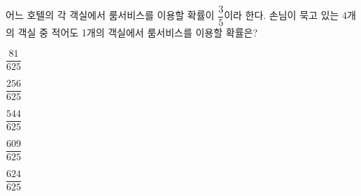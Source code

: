 어느 호텔의 각 객실에서 룸서비스를 이용할 확률이 $\dfrac{3}{5}$이라 한다. 손님이 묵고 있는 4개의 객실 중 적어도 1개의 객실에서 룸서비스를 이용할 확률은?
\begin{choices32}{\rule[-3ex]{0pt}{8ex}$\dfrac{81}{625}$}{\rule[-3ex]{0pt}{8ex}$\dfrac{256}{625}$}{\rule[-3ex]{0pt}{8ex}$\dfrac{544}{625}$}{\rule[-3ex]{0pt}{8ex}$\dfrac{609}{625}$}{\rule[-3ex]{0pt}{8ex}$\dfrac{624}{625}$}\end{choices32}
